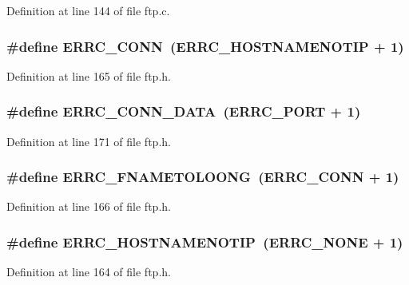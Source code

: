 Definition at line 144 of file ftp.c.

\hypertarget{group__ftp_gad095bd01c68b22025a316e548cc955b5}{
\subsubsection[{ERRC\_\-CONN}]{\setlength{\rightskip}{0pt plus 5cm}\#define ERRC\_\-CONN~(ERRC\_\-HOSTNAMENOTIP + 1)}}
\label{group__ftp_gad095bd01c68b22025a316e548cc955b5}


Definition at line 165 of file ftp.h.

\hypertarget{group__ftp_gafdeae57f1aa8e5279b2faf3e3619cfe3}{
\subsubsection[{ERRC\_\-CONN\_\-DATA}]{\setlength{\rightskip}{0pt plus 5cm}\#define ERRC\_\-CONN\_\-DATA~(ERRC\_\-PORT + 1)}}
\label{group__ftp_gafdeae57f1aa8e5279b2faf3e3619cfe3}


Definition at line 171 of file ftp.h.

\hypertarget{group__ftp_ga4f93f63c6a0a40d34ecb3b0ef0f3d56b}{
\subsubsection[{ERRC\_\-FNAMETOLOONG}]{\setlength{\rightskip}{0pt plus 5cm}\#define ERRC\_\-FNAMETOLOONG~(ERRC\_\-CONN + 1)}}
\label{group__ftp_ga4f93f63c6a0a40d34ecb3b0ef0f3d56b}


Definition at line 166 of file ftp.h.

\hypertarget{group__ftp_ga1c8411c28dee6c0b2d222a447e2995f8}{
\subsubsection[{ERRC\_\-HOSTNAMENOTIP}]{\setlength{\rightskip}{0pt plus 5cm}\#define ERRC\_\-HOSTNAMENOTIP~(ERRC\_\-NONE + 1)}}
\label{group__ftp_ga1c8411c28dee6c0b2d222a447e2995f8}


Definition at line 164 of file ftp.h.

